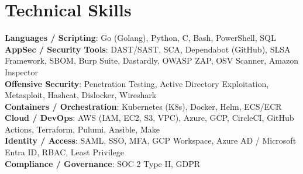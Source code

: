 \documentclass[letterpaper,10pt]{article}
\begin{document}
\section{Technical Skills}
 \begin{itemize}[leftmargin=0.15in, label={}]
    \small{\item{
    \textbf{Languages / Scripting}{: Go (Golang), Python, C, Bash, PowerShell, SQL} \\
    \textbf{AppSec / Security Tools}{: DAST/SAST, SCA, Dependabot (GitHub), SLSA Framework, SBOM, Burp Suite, Dastardly, OWASP ZAP, OSV Scanner, Amazon Inspector} \\
    \textbf{Offensive Security}{: Penetration Testing, Active Directory Exploitation, Metasploit, Hashcat, Dislocker, Wireshark} \\
    \textbf{Containers / Orchestration}{: Kubernetes (K8s), Docker, Helm, ECS/ECR} \\
    \textbf{Cloud / DevOps}{: AWS (IAM, EC2, S3, VPC), Azure, GCP, CircleCI, GitHub Actions, Terraform, Pulumi, Ansible, Make} \\
    \textbf{Identity / Access}{: SAML, SSO, MFA, GCP Workspace, Azure AD / Microsoft Entra ID, RBAC, Least Privilege} \\
    \textbf{Compliance / Governance}{: SOC 2 Type II, GDPR}
    }}
 \end{itemize}

\end{document}
